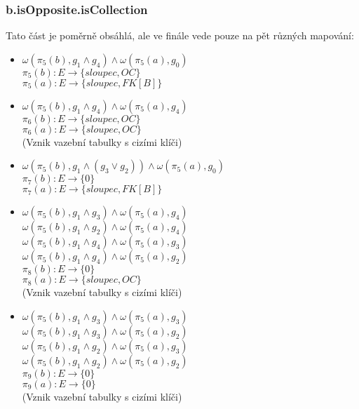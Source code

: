 \documentclass[11pt,a4paper]{article}
\begin{document}
   		\subsubsection{b.isOpposite.isCollection}
   		Tato část je poměrně obsáhlá, ale ve finále vede pouze na pět různých mapování:
   				\begin{itemize}				    
         			\item			$\omega(\pi_5(b),g_1 \wedge g_4) \wedge \omega(\pi_5(a), g_0)$\\        							
         							$\pi_5(b) : E \to \{ sloupec, OC\}$ \\
         							$\pi_5(a) : E \to \{ sloupec, FK[B]\}$		
         			\item			$\omega(\pi_5(b),g_1 \wedge g_4) \wedge \omega(\pi_5(a), g_4)$\\    							
         							$\pi_6(b) : E \to \{ sloupec, OC\}$ \\
         							$\pi_6(a) : E \to \{ sloupec, OC\}$	\\	
         							(Vznik vazební tabulky s cizími klíči)
         			\item			$\omega(\pi_5(b),g_1 \wedge (g_3 \vee g_2)) \wedge \omega(\pi_5(a), g_0)$\\   							
         							$\pi_7(b) : E \to \{ 0\}$ \\
         							$\pi_7(a) : E \to \{ sloupec, FK[B]\}$	\\
         			\item			$\omega(\pi_5(b),g_1 \wedge g_3) \wedge \omega(\pi_5(a), g_4)$\\
         							$\omega(\pi_5(b),g_1 \wedge g_2) \wedge \omega(\pi_5(a), g_4)$\\
         							$\omega(\pi_5(b),g_1 \wedge g_4) \wedge \omega(\pi_5(a), g_3)$\\
         							$\omega(\pi_5(b),g_1 \wedge g_4) \wedge \omega(\pi_5(a), g_2)$\\             							
         							$\pi_8(b) : E \to \{ 0\}$ \\
         							$\pi_8(a) : E \to \{ sloupec, OC\}$	\\	
         							(Vznik vazební tabulky s cizími klíči)	 
         		     \item 			$\omega(\pi_5(b),g_1 \wedge g_3) \wedge \omega(\pi_5(a), g_3)$\\
         							$\omega(\pi_5(b),g_1 \wedge g_3) \wedge \omega(\pi_5(a), g_2)$\\
         							$\omega(\pi_5(b),g_1 \wedge g_2) \wedge \omega(\pi_5(a), g_3)$\\
         							$\omega(\pi_5(b),g_1 \wedge g_2) \wedge \omega(\pi_5(a), g_2)$\\       							
         							$\pi_9(b) : E \to \{ 0\}$ \\
         							$\pi_9(a) : E \to \{ 0\}$	\\	
         							(Vznik vazební tabulky s cizími klíči)	 				   							
   				\end{itemize}			   		    
\end{document}
